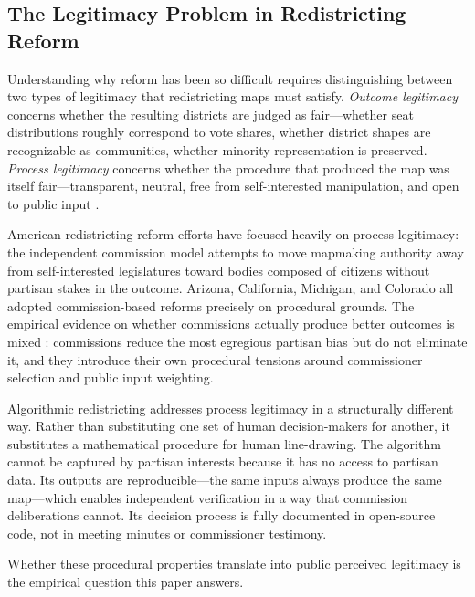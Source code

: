 \subsection{The Legitimacy Problem in Redistricting Reform}

Understanding why reform has been so difficult requires distinguishing between two types of legitimacy that redistricting maps must satisfy. \textit{Outcome legitimacy} concerns whether the resulting districts are judged as fair---whether seat distributions roughly correspond to vote shares, whether district shapes are recognizable as communities, whether minority representation is preserved. \textit{Process legitimacy} concerns whether the procedure that produced the map was itself fair---transparent, neutral, free from self-interested manipulation, and open to public input \citep{tyler2006legitimacy}.

American redistricting reform efforts have focused heavily on process legitimacy: the independent commission model attempts to move mapmaking authority away from self-interested legislatures toward bodies composed of citizens without partisan stakes in the outcome. Arizona, California, Michigan, and Colorado all adopted commission-based reforms precisely on procedural grounds. The empirical evidence on whether commissions actually produce better outcomes is mixed \citep{imig2022,kousser2013,stephanopoulos2015}: commissions reduce the most egregious partisan bias but do not eliminate it, and they introduce their own procedural tensions around commissioner selection and public input weighting.

Algorithmic redistricting addresses process legitimacy in a structurally different way. Rather than substituting one set of human decision-makers for another, it substitutes a mathematical procedure for human line-drawing. The algorithm cannot be captured by partisan interests because it has no access to partisan data. Its outputs are reproducible---the same inputs always produce the same map---which enables independent verification in a way that commission deliberations cannot. Its decision process is fully documented in open-source code, not in meeting minutes or commissioner testimony.

Whether these procedural properties translate into public perceived legitimacy is the empirical question this paper answers.
